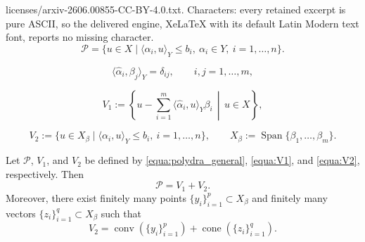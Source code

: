 \documentclass[10pt,a4paper]{amsart}
\begin{document}
licenses/arxiv-2606.00855-CC-BY-4.0.txt. Characters: every retained excerpt is pure ASCII, so the delivered engine, XeLaTeX with its default Latin Modern text font, reports no missing character.
\begin{equation}\label{equa:polydra_general}
    \mathcal{P}
    =
    \{u\in X\mid \langle \alpha_i,u\rangle_Y\le b_i,\ \alpha_i\in Y,\ i=1,\dots,n\}.
\end{equation}

\begin{equation}\label{equa:orthocod2}
\langle \hat{\alpha}_i,\beta_j\rangle_Y=\delta_{ij},\qquad i,j=1,\dots,m,
\end{equation}

\begin{equation}\label{equa:V1}
    V_1
    :=
    \left\{
    u-\sum_{i=1}^m \langle \hat{\alpha}_i,u\rangle_Y \beta_i
    \,\middle|\,
    u\in X
    \right\},
\end{equation}

\begin{equation}\label{equa:V2}
    V_2
    :=
    \{u\in X_\beta\mid \langle \alpha_i,u\rangle_Y\le b_i,\ i=1,\dots,n\},
    \qquad
    X_\beta:=\operatorname{Span}\{\beta_1,\dots,\beta_m\}.
\end{equation}

\begin{lemma}\label{lemma:decom_general}
Let $\mathcal{P}$, $V_1$, and $V_2$ be defined by \eqref{equa:polydra_general}, \eqref{equa:V1}, and \eqref{equa:V2}, respectively. Then
\[
\mathcal{P}=V_1+V_2.
\]
Moreover, there exist finitely many points $\{y_i\}_{i=1}^p\subset X_\beta$ and finitely many vectors $\{z_i\}_{i=1}^q\subset X_\beta$ such that
\begin{equation}\label{equa:decomll}
    V_2
    =
    \operatorname{conv}(\{y_i\}_{i=1}^p)
    +
    \operatorname{cone}(\{z_i\}_{i=1}^q).
\end{equation}
\end{lemma}
\end{document}
